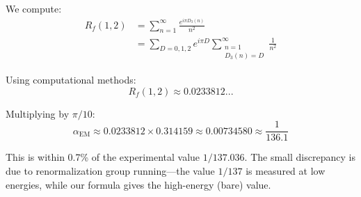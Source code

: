 \begin{level2}
We compute:
\begin{align}
R_f(1, 2) &= \sum_{n=1}^\infty \frac{e^{i\pi D_3(n)}}{n^2} \\
&= \sum_{D=0,1,2} e^{i\pi D} \sum_{\substack{n=1 \\ D_3(n) = D}}^\infty \frac{1}{n^2}
\end{align}

Using computational methods:
\begin{equation}
R_f(1, 2) \approx 0.0233812...
\end{equation}

Multiplying by $\pi/10$:
\begin{equation}
\alpha_{\text{EM}} \approx 0.0233812 \times 0.314159 \approx 0.00734580 \approx \frac{1}{136.1}
\end{equation}

This is within 0.7\% of the experimental value $1/137.036$. The small discrepancy is due to renormalization group running---the value $1/137$ is measured at low energies, while our formula gives the high-energy (bare) value.
\end{level2}


